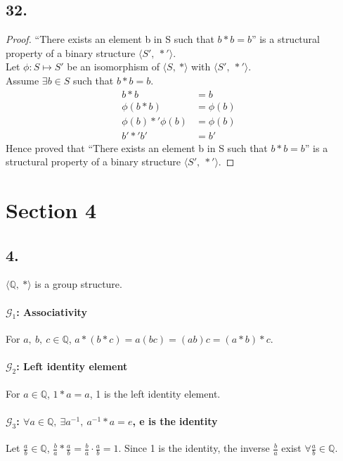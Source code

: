 \documentclass{article}
\begin{document}
\subsection*{32.}
\begin{proof} ``There exists an element b in S such that $b * b = b$'' is a structural 
	property of a binary structure $\langle S',\ *'\rangle$.\\
	Let $\phi: S \mapsto S'$ be an isomorphism of $\langle S,\ *\rangle$ with $\langle S',\
	*'\rangle$.\\
	Assume $\exists b \in S$ such that $b*b=b$. 
	\begin{align*}
		b*b &= b&\\
		\phi(b*b) &= \phi(b)&\\
		\phi(b)*'\phi(b) &= \phi(b)&\\
		b' *' b' &= b'&
	\end{align*}
	Hence proved that ``There exists an element b in S such that $b * b = b$'' is a structural 
	property of a binary structure $\langle S',\ *'\rangle$.
\end{proof}

\section*{Section 4}
\subsection*{4.}
	$\langle \mathbb{Q},\ * \rangle$ is a group structure.
	\paragraph{$\mathcal{G}_1$: Associativity} For $a,\ b,\ c\in \mathbb{Q}$,
	$a*(b*c) = a(bc) = (ab)c = (a*b)*c$.
	\paragraph{$\mathcal{G}_2$: Left identity element} For $a \in 
	\mathbb{Q}$, $1 * a = a$, 1 is the left identity element.
	\paragraph{$\mathcal{G}_3$: $\forall a \in \mathbb{Q},\ 
	\exists a^{-1},\ a^{-1}*a=e$, e is the identity}
	Let $\frac{a}{b} \in \mathbb{Q}$, $\frac{b}{a} * \frac{a}{b}=\frac{b}{a}
	\cdot \frac{a}{b}=1$. Since 1 is the identity, the inverse $\frac{b}{a}$ 
	exist $\forall \frac{a}{b}\in\mathbb{Q}$.
\end{document}
